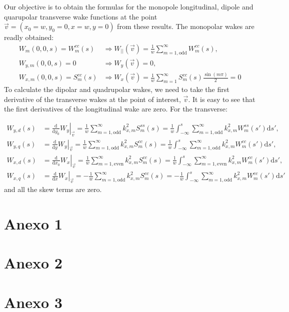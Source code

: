 \begin{apendicesenv}
    Our objective is to obtain the formulas for the monopole longitudinal, dipole and quarupolar transverse wake functions at the point $\vec{v} = (x_0=w,y_0=0,x=w,y=0)$ from these results. The monopolar wakes are readly obtained:
    \begin{align}
		W_m(0,0,s) = W^{cc}_m(s) &\Rightarrow W_{||}(\vec{v}) = \frac1w\sum^\infty_{m=1,\mathrm{odd}} W^{cc}_m(s), \\
		W_{y,m}(0,0,s) = 0 &\Rightarrow W_y(\vec{v}) = 0, \\
		W_{x,m}(0,0,s) = S^{cc}_m(s) &\Rightarrow W_x(\vec{v}) = \frac1w\sum^\infty_{m=1} S^{cc}_m(s)\frac{\sin(m\pi)}{2} = 0
    \end{align}
    To calculate the dipolar and quadrupolar wakes, we need to take the first derivative of the transverse wakes at the point of interest, $\vec{v}$. It is easy to see that the first derivatives of the longitudinal wake are zero. For the transverse:

    \begin{align}
		W_{y,d}(s) &= \left.\frac{\mathrm{d}}{\mathrm{d}y_0}W_y\right|_{\vec{v}} = \frac1w\sum^\infty_{m=1,\mathrm{odd}} k_{x,m}^2 S^{ss}_m(s) = \frac1w\int_{-\infty}^s\sum^\infty_{m=1,\mathrm{odd}} k_{x,m}^2 W^{ss}_m(s') \mathrm{d}s',\\
		W_{y,q}(s) &= \left.\frac{\mathrm{d}}{\mathrm{d}y}W_y\right|_{\vec{v}} = \frac1w\sum^\infty_{m=1,\mathrm{odd}} k_{x,m}^2 S^{cc}_m(s) = \frac1w\int_{-\infty}^s\sum^\infty_{m=1,\mathrm{odd}} k_{x,m}^2 W^{cc}_m(s') \mathrm{d}s', \\
		W_{x,d}(s) &= \left.\frac{\mathrm{d}}{\mathrm{d}x_0}W_x\right|_{\vec{v}} = \frac1w\sum^\infty_{m=1,\mathrm{even}} k_{x,m}^2 S^{cc}_m(s) = \frac1w\int_{-\infty}^s\sum^\infty_{m=1,\mathrm{even}}k_{x,m}^2 W^{cc}_m(s') \mathrm{d}s', \\
		W_{x,q}(s) &= \left.\frac{\mathrm{d}}{\mathrm{d}x}W_x\right|_{\vec{v}} = -\frac1w\sum^\infty_{m=1,\mathrm{odd}} k_{x,m}^2 S^{cc}_m(s) =-\frac1w\int_{-\infty}^s\sum^\infty_{m=1,\mathrm{odd}} k_{x,m}^2 W^{cc}_m(s') \mathrm{d}s'
    \end{align}
    and all the skew terms are zero.

\end{apendicesenv}


\begin{anexosenv}
\partanexos
\chapter{Anexo 1}
    \lipsum[30]
\chapter{Anexo 2}
    \lipsum[31]
\chapter{Anexo 3}
    \lipsum[32]
\end{anexosenv}


\printindex

\printglossaries


